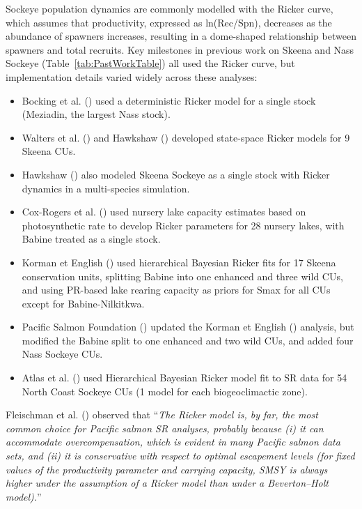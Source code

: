 \documentclass[french,11pt]{book}
\begin{document}
Sockeye population dynamics are commonly modelled with the Ricker curve, which assumes that productivity, expressed as ln(Rec/Spn), decreases as the abundance of spawners increases, resulting in a dome-shaped relationship between spawners and total recruits. Key milestones in previous work on Skeena and Nass Sockeye (Table~\ref{tab:PastWorkTable}) all used the Ricker curve, but implementation details varied widely across these analyses:
\begin{itemize}

\item
  Bocking et al. () used a deterministic Ricker model for a single stock (Meziadin, the largest Nass stock).
\item
  Walters et al. () and Hawkshaw () developed state-space Ricker models for 9 Skeena CUs.
\item
  Hawkshaw () also modeled Skeena Sockeye as a single stock with Ricker dynamics in a multi-species simulation.
\item
  Cox-Rogers et al. () used nursery lake capacity estimates based on photosynthetic rate to develop Ricker parameters for 28 nursery lakes, with Babine treated as a single stock.
\item
  Korman et English () used hierarchical Bayesian Ricker fits for 17 Skeena conservation units, splitting Babine into one enhanced and three wild CUs, and using PR-based lake rearing capacity as priors for Smax for all CUs except for Babine-Nilkitkwa.
\item
  Pacific Salmon Foundation () updated the Korman et English () analysis, but modified the Babine split to one enhanced and two wild CUs, and added four Nass Sockeye CUs.
\item
  Atlas et al. () used Hierarchical Bayesian Ricker model fit to SR data for 54 North Coast Sockeye CUs (1 model for each biogeoclimactic zone).
\end{itemize}
Fleischman et al. () observed that ``\emph{The Ricker model is, by far, the most common choice for Pacific salmon SR analyses, probably because (i) it can accommodate overcompensation, which is evident in many Pacific salmon data sets, and (ii) it is conservative with respect to optimal escapement levels (for fixed values of the productivity parameter and carrying capacity, SMSY is always higher under the assumption of a Ricker model than under a Beverton--Holt model).}''
\end{document}
